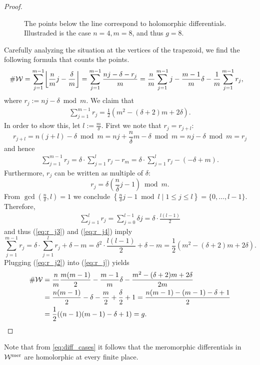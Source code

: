 \documentclass[main.tex]{subfiles}
\begin{document}
\begin{proof}
\begin{figure}[H]
      \begin{center}
   
      \end{center}
    \caption{The points below the line correspond to holomorphic differentials. Illustraded is the case $n=4,m=8$, and thus $g = 8$.}
    \label{fig:holom_diff}
\end{figure}
     Carefully analyzing the situation at the vertices of the trapezoid, we find the following formula that counts the points.
     \begin{align}\label{eq:r_j}
 \#\W & = \sum_{j = 1}^{m-1} \floor*{\frac{n}{m}j - \frac{\delta}{m}} = \sum_{j = 1}^{m-1} \frac{nj-\delta-r_j}{m} =
  \frac{n}{m} \sum_{j=1}^{m-1} j - \frac{m-1}{m}\delta - \frac{1}{m} \sum_{j=1}^{m-1} r_j,
     \end{align}
      where $r_j := nj - \delta  \bmod m$. \abstand
      We claim that
      \begin{align}\label{eq:r_j2}
       \sum_{j=1}^{m-1} r_j = \frac{1}{2}(m^2 - (\delta+2)m + 2\delta).
      \end{align}
      In order to show this, let $l := \frac{m}{\delta}$. First we note that $r_j = r_{j+l}$:
      $$r_{j+l} = n(j+l) - \delta  \bmod m = nj + \frac{n}{\delta}m - \delta  \bmod m =  nj - \delta  \bmod m =  r_j$$
      and hence
      \begin{align}\label{eq:r_j3}
       \sum_{j=1}^{m-1} r_j = \delta \cdot \sum_{j=1}^{l} r_j - r_m = \delta \cdot \sum_{j=1}^{l} r_j - (-\delta + m).
      \end{align}
      Furthermore, $r_j$ can be written as multiple of $\delta$:
      $$r_j = \delta \left(\frac{n}{\delta}j - 1\right)  \bmod m.$$
      From $\gcd(\frac{n}{\delta},l) = 1$ we conclude $\left\{  \frac{n}{\delta}j - 1  \bmod l  \mid  1 \le j \le l  \right\} = \{  0,\dots,l-1  \}$.
      Therefore,
      \begin{align}\label{eq:r_j4}
       \sum_{j = 1}^l r_j = \sum_{j = 0}^{l-1} \delta j = \delta \cdot \frac{l(l-1)}{2}
      \end{align}
      and thus (\ref{eq:r_j3}) and (\ref{eq:r_j4}) imply
      $$\sum_{j=1}^{m-1} r_j = \delta \cdot \sum_{j=1}^{l} r_j + \delta - m = \delta^2 \cdot \frac{l(l-1)}{2} + \delta - m = \frac{1}{2}(m^2 - (\delta+2)m + 2\delta).$$
      Plugging (\ref{eq:r_j2}) into (\ref{eq:r_j}) yields
      \begin{align*}
 \#\mathcal{W} & = \frac{n}{m}\frac{m(m-1)}{2} - \frac{m-1}{m}\delta - \frac{m^2 - (\delta+2)m + 2\delta}{2m} \\
        & = \frac{n(m-1)}{2} - \delta  - \frac{m}{2} + \frac{\delta}{2} + 1 =  \frac{n(m-1) - (m-1) - \delta + 1}{2} \\
        & = \frac{1}{2}((n-1)(m-1)-\delta+1) = g.
      \end{align*}
     \end{proof}
     \begin{rmk}
      Note that from \eqref{eq:diff_cases} it follows that the meromorphic differentials in $\mathcal{W}^{\text{mer}}$ are homolorphic at every finite place.
     \end{rmk}

\biblio
\end{document}
